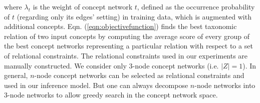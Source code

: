 %
where $\lambda_t$ is the weight of concept network $t$, defined as the
occurrence probability of $t$ (regarding only its edges' setting) in
training data, which is augmented with additional
concepts. Eqn. (\ref{eqn:objectivefunction}) finds the best taxonomic
relation of two input concepts by computing the average score of every
group of the best concept networks representing a particular relation
with respect to a set of relational constraints.  The relational
constraints used in our experiments are manually constructed. We consider
only 3-node concept networks (i.e. $|Z| = 1$). In general, $n$-node
concept networks can be selected as relational constraints and used in
our inference model. But one can always decompose $n$-node networks
into $3$-node networks to allow greedy search in the concept
network space.


